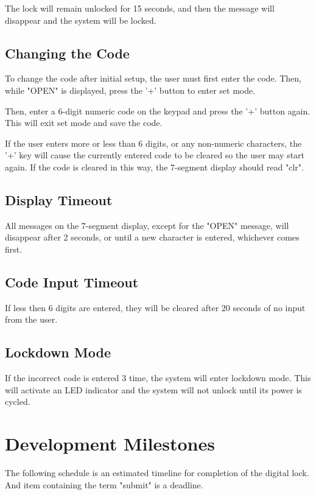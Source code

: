 \documentclass[11pt]{article}
\begin{document}
The lock will remain unlocked for 15 seconds, and then the message will disappear and the system will be locked.

\subsection{Changing the Code}

To change the code after initial setup, the user must first enter the code. Then, while "OPEN" is displayed, press the '+' button to enter set mode.

Then, enter a 6-digit numeric code on the keypad and press the '+' button again. This will exit set mode and save the code.

If the user enters more or less than 6 digits, or any non-numeric characters, the '+' key will cause the currently entered code to be cleared so the user may start again. If the code is cleared in this way, the 7-segment display should read "clr".

\subsection{Display Timeout}

All messages on the 7-segment display, except for the "OPEN" message, will disappear after 2 seconds, or until a new character is entered, whichever comes first.

\subsection{Code Input Timeout}

If less then 6 digits are entered, they will be cleared after 20 seconds of no input from the user.

\subsection{Lockdown Mode}

If the incorrect code is entered 3 time, the system will enter lockdown mode. This will activate an LED indicator and the system will not unlock until its power is cycled.

\section{Development Milestones}

The following schedule is an estimated timeline for completion of the digital lock. And item containing the term "submit" is a deadline.
\end{document}
